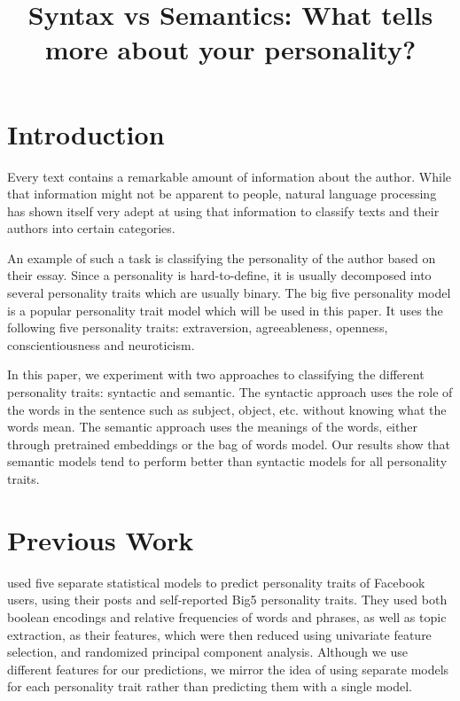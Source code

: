\documentclass[10pt, a4paper]{article}
\title{Syntax vs Semantics: What tells more about your personality?}
\begin{document}
\maketitleabstract

\section{Introduction}

Every text contains a remarkable amount of information about the author.
While that information might not be apparent to people, natural language processing has shown itself very adept at using that information to classify texts and their authors into certain categories.

An example of such a task is classifying the personality of the author based on their essay.
Since a personality is hard-to-define, it is usually decomposed into several personality traits which are usually binary.
The big five personality model is a popular personality trait model which will be used in this paper.
It uses the following five personality traits: extraversion, agreeableness, openness, conscientiousness and neuroticism.

In this paper, we experiment with two approaches to classifying the different personality traits: syntactic and semantic.
The syntactic approach uses the role of the words in the sentence such as subject, object, etc. without knowing what the words mean.
The semantic approach uses the meanings of the words, either through pretrained embeddings or the bag of words model.
Our results show that semantic models tend to perform better than syntactic models for all personality traits.

\section{Previous Work}

\cite{park} used five separate statistical models to predict personality traits of Facebook users, using their posts and self-reported Big5 personality traits.
They used both boolean encodings and relative frequencies of words and phrases, as well as topic extraction, as their features, which were then reduced using univariate feature selection, and randomized principal component analysis.
Although we use different features for our predictions, we mirror the idea of using separate models for each personality trait rather than predicting them with a single model.
\end{document}
